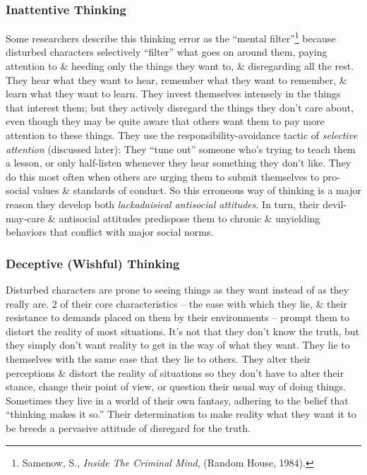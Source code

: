 \documentclass{article}
\numberwithin{equation}{section}
\begin{document}
\subsubsection{Inattentive Thinking}
Some researchers describe this thinking error as the ``mental filter''\footnote{Samenow, S., {\it Inside The Criminal Mind}, (Random House, 1984).} because disturbed characters selectively ``filter'' what goes on around them, paying attention to \& heeding only the things they want to, \& disregarding all the rest. They hear what they want to hear, remember what they want to remember, \& learn what they want to learn. They invest themselves intensely in the things that interest them; but they actively disregard the things they don't care about, even though they may be quite aware that others want them to pay more attention to these things. They use the responsibility-avoidance tactic of \textit{selective attention} (discussed later): They ``tune out'' someone who's trying to teach them a lesson, or only half-listen whenever they hear something they don't like. They do this most often when others are urging them to submit themselves to pro-social values \& standards of conduct. So this erroneous way of thinking is a major reason they develop both \textit{lackadaisical antisocial attitudes}. In turn, their devil-may-care \& antisocial attitudes predispose them to chronic \& unyielding behaviors that conflict with major social norms.

\subsubsection{Deceptive (Wishful) Thinking}
Disturbed characters are prone to seeing things as they want instead of as they really are. 2 of their core characteristics -- the ease with which they lie, \& their resistance to demands placed on them by their environments -- prompt them to distort the reality of most situations. It's not that they don't know the truth, but they simply don't want reality to get in the way of what they want. They lie to themselves with the same ease that they lie to others. They alter their perceptions \& distort the reality of situations so they don't have to alter their stance, change their point of view, or question their usual way of doing things. Sometimes they live in a world of their own fantasy, adhering to the belief that ``thinking makes it so.'' Their determination to make reality what they want it to be breeds a pervasive attitude of disregard for the truth.
\end{document}
